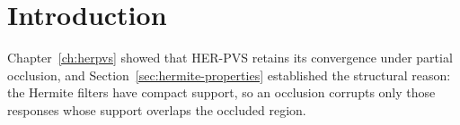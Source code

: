 %
%

\section{Introduction}
\label{sec:ch4-intro}

Chapter~\ref{ch:herpvs} showed that HER-PVS retains its convergence under
partial occlusion, and Section~\ref{sec:hermite-properties} established the
structural reason: the Hermite filters have compact support, so an occlusion
corrupts only those responses whose support overlaps the occluded region.

